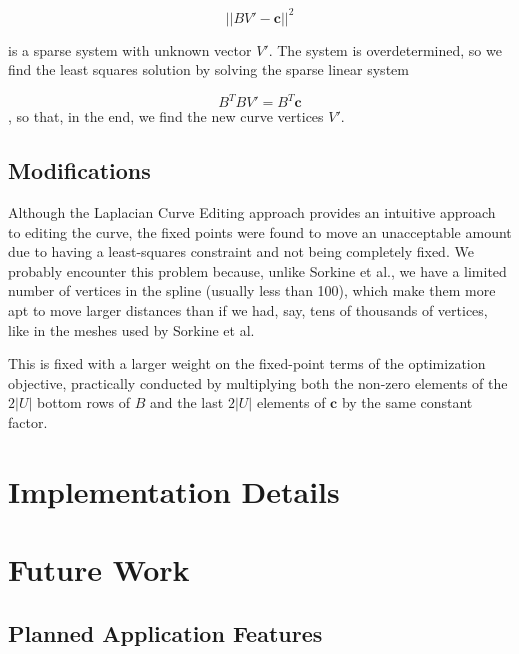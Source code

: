 \documentclass[english]{article}
\begin{document}
\[
||BV'- \mathbf{c}||^2
\]

is a sparse system with unknown vector $V'$. The system is overdetermined, so we find the least squares solution by solving the sparse linear system

\[
B^TBV' = B^T\mathbf{c}
\],
so that, in the end, we find the new curve vertices $V'$.

\subsection{Modifications}

Although the Laplacian Curve Editing approach provides an intuitive approach to editing the curve, the fixed points were found to move an unacceptable amount due to having a least-squares constraint and not being completely fixed. We probably encounter this problem because, unlike Sorkine et al., we have a limited number of vertices in the spline (usually less than 100), which make them more apt to move larger distances than if we had, say, tens of thousands of vertices, like in the meshes used by Sorkine et al.

This is fixed with a larger weight on the fixed-point terms of the optimization objective, practically conducted by multiplying both the non-zero elements of the $2|U|$ bottom rows of $B$ and the last $2|U|$ elements of $\mathbf{c}$ by the same constant factor.



\pagebreak

\section{Implementation Details} \label{section_implementation}


\pagebreak

\section{Future Work} \label{section_future_work}


\subsection{Planned Application Features}

\end{document}
